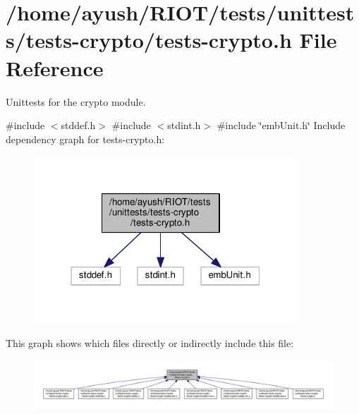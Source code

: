 \hypertarget{tests-crypto_8h}{}\section{/home/ayush/\+R\+I\+O\+T/tests/unittests/tests-\/crypto/tests-\/crypto.h File Reference}
\label{tests-crypto_8h}


Unittests for the {\ttfamily crypto} module.  


{\ttfamily \#include $<$stddef.\+h$>$}\newline
{\ttfamily \#include $<$stdint.\+h$>$}\newline
{\ttfamily \#include \char`\"{}emb\+Unit.\+h\char`\"{}}\newline
Include dependency graph for tests-\/crypto.h\+:
\nopagebreak
\begin{figure}[H]
\begin{center}
\leavevmode
\includegraphics[width=280pt]{tests-crypto_8h__incl}
\end{center}
\end{figure}
This graph shows which files directly or indirectly include this file\+:
\nopagebreak
\begin{figure}[H]
\begin{center}
\leavevmode
\includegraphics[width=350pt]{tests-crypto_8h__dep__incl}
\end{center}
\end{figure}
